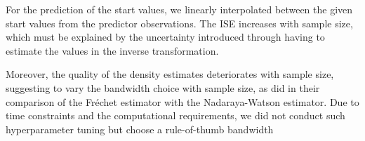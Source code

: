 For the prediction of the start values, we linearly interpolated between the given start
values from the predictor observations. The ISE increases with sample size, which must
be explained by the uncertainty introduced through having to estimate the values in the
inverse transformation.

Moreover, the quality of the density estimates deteriorates with sample size, suggesting
to vary the bandwidth choice with sample size, as \textcite{PetersenMüller2019} did in
their comparison of the Fréchet estimator with the Nadaraya-Watson estimator. Due to
time constraints and the computational requirements, we did not conduct such
hyperparameter tuning but choose a rule-of-thumb bandwidth
\parencites[Chapter~3.4.1]{Silverman1986}[Chapter~2.2.1]{LiRacine2007}
